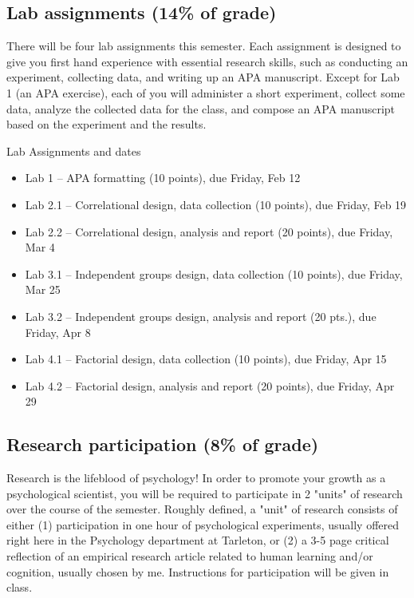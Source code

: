 \documentclass[10pt]{article}
\begin{document}
\subsection*{Lab assignments (14\% of grade)}
\label{sec-5-2}

There will be four lab assignments this semester.  Each assignment is designed to give you first hand experience with essential research skills, such as conducting an experiment, collecting data, and writing up an APA manuscript.  Except for Lab 1 (an APA exercise), each of you will administer a short experiment, collect some data, analyze the collected data for the class, and compose an APA manuscript based on the experiment and the results. 

Lab Assignments and dates

\begin{itemize}
\item Lab 1 – APA formatting (10 points), due Friday, Feb 12
\item Lab 2.1 – Correlational design, data collection (10 points), due Friday, Feb 19
\item Lab 2.2 – Correlational design, analysis and report (20 points), due Friday, Mar 4
\item Lab 3.1 – Independent groups design, data collection (10 points), due Friday, Mar 25
\item Lab 3.2 – Independent groups design, analysis and report (20 pts.), due Friday, Apr 8
\item Lab 4.1 – Factorial design, data collection (10 points), due Friday, Apr 15
\item Lab 4.2 – Factorial design, analysis and report (20 points), due Friday, Apr 29
\end{itemize}

\subsection*{Research participation (8\% of grade)}
\label{sec-5-3}

Research is the lifeblood of psychology!  In order to promote your growth as a psychological scientist, you will be required to participate in 2 "units" of research over the course of the semester.  Roughly defined, a "unit" of research consists of either (1) participation in one hour of psychological experiments, usually offered right here in the Psychology department at Tarleton, or (2) a 3-5 page critical reflection of an empirical research article related to human learning and/or cognition, usually chosen by me.  Instructions for participation will be given in class.
\end{document}
